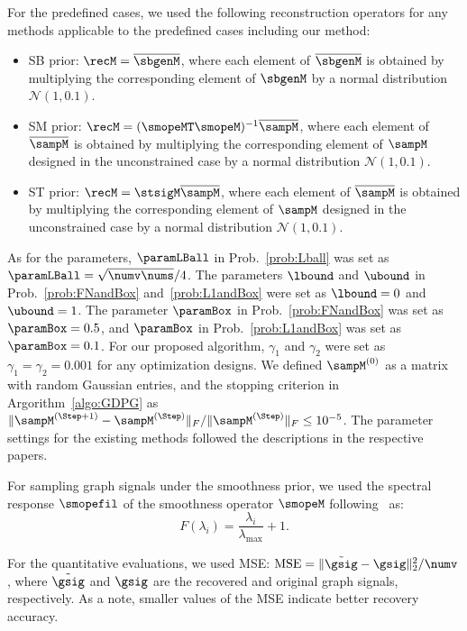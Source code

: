 \documentclass[journal]{IEEEtran}
\begin{document}
For the predefined cases, we used the following reconstruction operators for any methods applicable to the predefined cases including our method:
\begin{itemize}[align=parleft, left=1.1mm, labelsep=1.1mm, itemindent=0mm]
    \item SB prior: $\recM = \overline{\sbgenM}$, where each element of $\overline{\sbgenM}$ is obtained by multiplying the corresponding element of $\sbgenM$ by a normal distribution $\mathcal{N}(1,0.1)$.
    \item SM prior: $\recM = (\smopeMT \smopeM)^{-1} \overline{\sampM}$, where each element of $\overline{\sampM}$ is obtained by multiplying the corresponding element of $\sampM$ designed in the unconstrained case by a normal distribution $\mathcal{N}(1,0.1)$.
    \item ST prior: $\recM = \stsigM \overline{\sampM}$, where each element of $\overline{\sampM}$ is obtained by multiplying the corresponding element of $\sampM$ designed in the unconstrained case by a normal distribution $\mathcal{N}(1,0.1)$.
\end{itemize}

As for the parameters, $\paramLBall$ in Prob.~\eqref{prob:Lball} was set as $\paramLBall = \sqrt{\numv\nums}/4$.
The parameters $\lbound$ and $\ubound$ in Prob.~\eqref{prob:FNandBox} and~\eqref{prob:L1andBox} were set as $\lbound = 0$ and $\ubound = 1$.
The parameter $\paramBox$ in Prob.~\eqref{prob:FNandBox} was set as $\paramBox = 0.5$, and $\paramBox$ in Prob.~\eqref{prob:L1andBox} was set as $\paramBox = 0.1$.
For our proposed algorithm, $\gamma_1$ and $\gamma_2$ were set as $\gamma_1 = \gamma_2 = 0.001$ for any optimization designs.
We defined $\sampM^{(0)}$ as a matrix with random Gaussian entries, and the stopping criterion in Argorithm~\ref{algo:GDPG} as $\|\sampM^{(\Step + 1)} - \sampM^{(\Step)}\|_{F}/\|\sampM^{(\Step)}\|_{F} \leq 10^{-5}$.
The parameter settings for the existing methods followed the descriptions in the respective papers.

For sampling graph signals under the smoothness prior, we used the spectral response $\smopefil$ of the smoothness operator $\smopeM$ following~\cite{tanaka2020gensamp} as:
\begin{equation}
    F(\lambda_i) = \frac{\lambda_i}{\lambda_\mathrm{max}} + 1.
\end{equation}

For the quantitative evaluations, we used MSE: $\mathrm{MSE} = \|\tilde{\gsig} - \gsig\|^{2}_2/\numv$, where $\tilde{\gsig}$ and $\gsig$ are the recovered and original graph signals, respectively.
As a note, smaller values of the MSE indicate better recovery accuracy.
\end{document}
